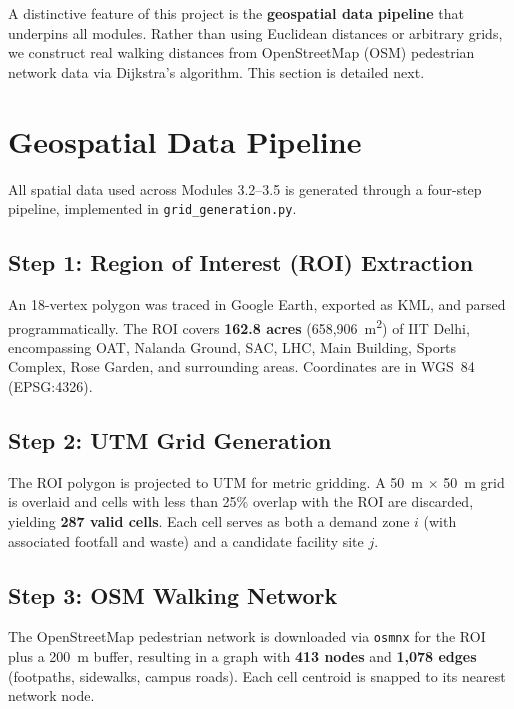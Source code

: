 \documentclass[11pt,a4paper]{article}
\begin{document}
A distinctive feature of this project is the \textbf{geospatial data pipeline} that underpins all modules. Rather than using Euclidean distances or arbitrary grids, we construct real walking distances from OpenStreetMap (OSM) pedestrian network data via Dijkstra's algorithm. This section is detailed next.

\section{Geospatial Data Pipeline}
\label{sec:geospatial}

All spatial data used across Modules 3.2--3.5 is generated through a four-step pipeline, implemented in \texttt{grid\_generation.py}.

\subsection{Step 1: Region of Interest (ROI) Extraction}

An 18-vertex polygon was traced in Google Earth, exported as KML, and parsed programmatically. The ROI covers \textbf{162.8 acres} (658,906~m\textsuperscript{2}) of IIT Delhi, encompassing OAT, Nalanda Ground, SAC, LHC, Main Building, Sports Complex, Rose Garden, and surrounding areas. Coordinates are in WGS~84 (EPSG:4326).

\subsection{Step 2: UTM Grid Generation}

The ROI polygon is projected to UTM for metric gridding. A 50~m $\times$ 50~m grid is overlaid and cells with less than 25\% overlap with the ROI are discarded, yielding \textbf{287 valid cells}. Each cell serves as both a demand zone $i$ (with associated footfall and waste) and a candidate facility site $j$.

\subsection{Step 3: OSM Walking Network}

The OpenStreetMap pedestrian network is downloaded via \texttt{osmnx} for the ROI plus a 200~m buffer, resulting in a graph with \textbf{413 nodes} and \textbf{1,078 edges} (footpaths, sidewalks, campus roads). Each cell centroid is snapped to its nearest network node.
\end{document}
